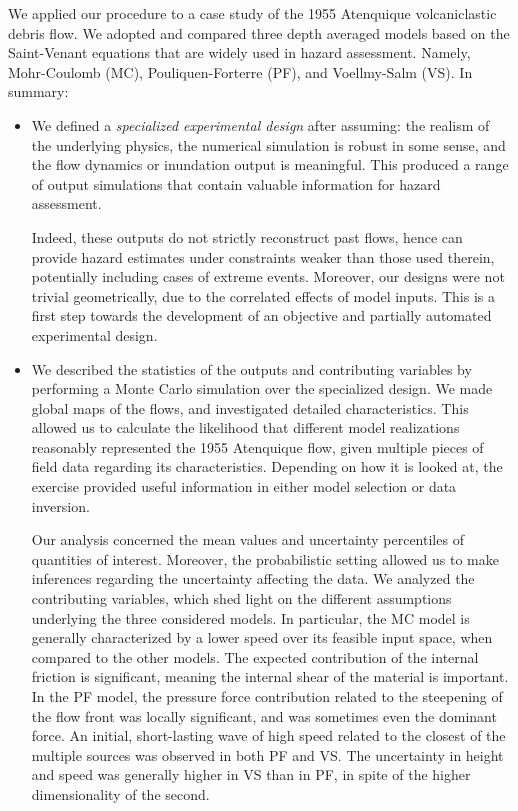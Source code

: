 \documentclass[nhess, manuscript]{copernicus}
\begin{document}
We applied our procedure to a case study of the 1955 Atenquique volcaniclastic debris flow. We adopted and compared three depth averaged models based on the Saint-Venant equations that are widely used in hazard assessment. Namely, Mohr-Coulomb (MC), Pouliquen-Forterre (PF), and Voellmy-Salm (VS). In summary:
\begin{itemize}
  \item We defined a \emph{specialized experimental design} after assuming: the realism of the underlying physics, the numerical simulation is robust in some sense, and the flow dynamics or inundation output is meaningful. This produced a range of output simulations that contain valuable information for hazard assessment.

      Indeed, these outputs do not strictly reconstruct past flows, hence can provide hazard estimates under constraints weaker than those used therein, potentially including  cases of extreme events. Moreover, our designs were not trivial geometrically, due to the correlated effects of model inputs. This is a first step towards the development of an objective and partially automated experimental design.

  \item We described the statistics of the outputs and contributing variables by performing a Monte Carlo simulation over the specialized design. We made global maps of the flows, and investigated detailed characteristics. This allowed us to calculate the likelihood that different model realizations reasonably represented the 1955 Atenquique flow, given multiple pieces of field data regarding its characteristics.  Depending on how it is looked at, the exercise provided useful information in either model selection or data inversion.

      Our analysis concerned the mean values and uncertainty percentiles of quantities of interest. Moreover, the probabilistic setting allowed us to make inferences regarding the uncertainty affecting the data. We analyzed the contributing variables, which shed light on the different assumptions underlying the three considered models. In particular, the MC model is generally characterized by a lower speed over its feasible input space, when compared to the other models. The expected contribution of the internal friction is significant, meaning the internal shear of the material is important. In the PF model, the pressure force contribution related to the steepening of the flow front was locally significant, and was sometimes even the dominant force. An initial, short-lasting wave of high speed related to the closest of the multiple sources was observed in both PF and VS. The uncertainty in height and speed was generally higher in VS than in PF, in spite of the higher dimensionality of the second.


\end{itemize}
\end{document}
